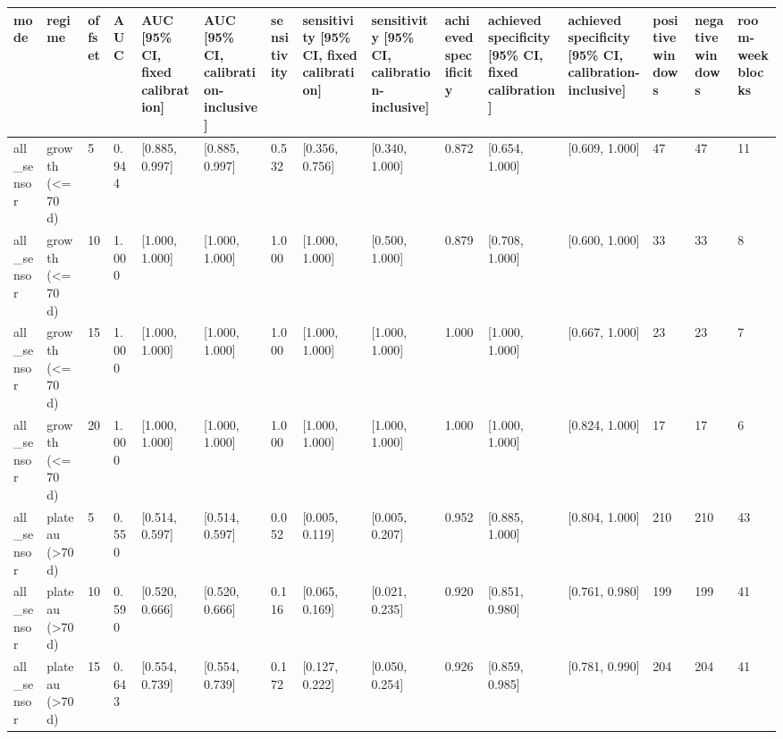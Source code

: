 \begin{tabular}{lllllllllllllll}
\hline
mode & regime & offset & AUC & AUC [95\% CI, fixed calibration] & AUC [95\% CI, calibration-inclusive] & sensitivity & sensitivity [95\% CI, fixed calibration] & sensitivity [95\% CI, calibration-inclusive] & achieved specificity & achieved specificity [95\% CI, fixed calibration] & achieved specificity [95\% CI, calibration-inclusive] & positive windows & negative windows & room-week blocks \\
\hline
all\_sensor & growth (<=70 d) & 5 & 0.944 & [0.885, 0.997] & [0.885, 0.997] & 0.532 & [0.356, 0.756] & [0.340, 1.000] & 0.872 & [0.654, 1.000] & [0.609, 1.000] & 47 & 47 & 11 \\
all\_sensor & growth (<=70 d) & 10 & 1.000 & [1.000, 1.000] & [1.000, 1.000] & 1.000 & [1.000, 1.000] & [0.500, 1.000] & 0.879 & [0.708, 1.000] & [0.600, 1.000] & 33 & 33 & 8 \\
all\_sensor & growth (<=70 d) & 15 & 1.000 & [1.000, 1.000] & [1.000, 1.000] & 1.000 & [1.000, 1.000] & [1.000, 1.000] & 1.000 & [1.000, 1.000] & [0.667, 1.000] & 23 & 23 & 7 \\
all\_sensor & growth (<=70 d) & 20 & 1.000 & [1.000, 1.000] & [1.000, 1.000] & 1.000 & [1.000, 1.000] & [1.000, 1.000] & 1.000 & [1.000, 1.000] & [0.824, 1.000] & 17 & 17 & 6 \\
all\_sensor & plateau (>70 d) & 5 & 0.550 & [0.514, 0.597] & [0.514, 0.597] & 0.052 & [0.005, 0.119] & [0.005, 0.207] & 0.952 & [0.885, 1.000] & [0.804, 1.000] & 210 & 210 & 43 \\
all\_sensor & plateau (>70 d) & 10 & 0.590 & [0.520, 0.666] & [0.520, 0.666] & 0.116 & [0.065, 0.169] & [0.021, 0.235] & 0.920 & [0.851, 0.980] & [0.761, 0.980] & 199 & 199 & 41 \\
all\_sensor & plateau (>70 d) & 15 & 0.643 & [0.554, 0.739] & [0.554, 0.739] & 0.172 & [0.127, 0.222] & [0.050, 0.254] & 0.926 & [0.859, 0.985] & [0.781, 0.990] & 204 & 204 & 41 \\

\end{tabular}
